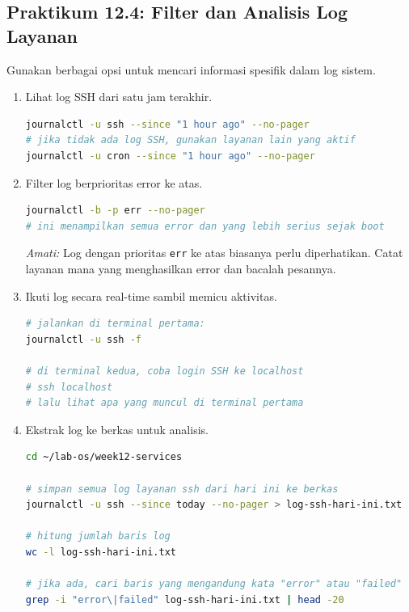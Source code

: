 \subsection*{Praktikum 12.4: Filter dan Analisis Log Layanan}

Gunakan berbagai opsi  untuk mencari informasi spesifik dalam log sistem.

\begin{enumerate}
    \item Lihat log SSH dari satu jam terakhir.
\begin{lstlisting}[language=bash, caption={Log SSH satu jam terakhir}]
journalctl -u ssh --since "1 hour ago" --no-pager
# jika tidak ada log SSH, gunakan layanan lain yang aktif
journalctl -u cron --since "1 hour ago" --no-pager
\end{lstlisting}

    \item Filter log berprioritas error ke atas.
\begin{lstlisting}[language=bash, caption={Log prioritas error dari boot saat ini}]
journalctl -b -p err --no-pager
# ini menampilkan semua error dan yang lebih serius sejak boot
\end{lstlisting}

    \textit{Amati:} Log dengan prioritas \texttt{err} ke atas biasanya perlu diperhatikan. Catat layanan mana yang menghasilkan error dan bacalah pesannya.

    \item Ikuti log secara real-time sambil memicu aktivitas.
\begin{lstlisting}[language=bash, caption={Pantau log SSH secara real-time}]
# jalankan di terminal pertama:
journalctl -u ssh -f

# di terminal kedua, coba login SSH ke localhost
# ssh localhost
# lalu lihat apa yang muncul di terminal pertama
\end{lstlisting}

    \item Ekstrak log ke berkas untuk analisis.
\begin{lstlisting}[language=bash, caption={Simpan log ke berkas}]
cd ~/lab-os/week12-services

# simpan semua log layanan ssh dari hari ini ke berkas
journalctl -u ssh --since today --no-pager > log-ssh-hari-ini.txt

# hitung jumlah baris log
wc -l log-ssh-hari-ini.txt

# jika ada, cari baris yang mengandung kata "error" atau "failed"
grep -i "error\|failed" log-ssh-hari-ini.txt | head -20
\end{lstlisting}
\end{enumerate}

